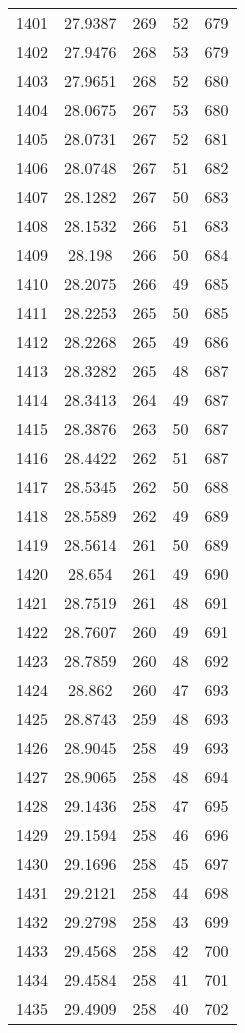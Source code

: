 \documentclass[12pt,a4paper]{article}
\begin{document}
\begin{tabular}{r|cccc}
	1401 & 27.9387 & 269 & 52 & 679 \\
	1402 & 27.9476 & 268 & 53 & 679 \\
	1403 & 27.9651 & 268 & 52 & 680 \\
	1404 & 28.0675 & 267 & 53 & 680 \\
	1405 & 28.0731 & 267 & 52 & 681 \\
	1406 & 28.0748 & 267 & 51 & 682 \\
	1407 & 28.1282 & 267 & 50 & 683 \\
	1408 & 28.1532 & 266 & 51 & 683 \\
	1409 & 28.198 & 266 & 50 & 684 \\
	1410 & 28.2075 & 266 & 49 & 685 \\
	1411 & 28.2253 & 265 & 50 & 685 \\
	1412 & 28.2268 & 265 & 49 & 686 \\
	1413 & 28.3282 & 265 & 48 & 687 \\
	1414 & 28.3413 & 264 & 49 & 687 \\
	1415 & 28.3876 & 263 & 50 & 687 \\
	1416 & 28.4422 & 262 & 51 & 687 \\
	1417 & 28.5345 & 262 & 50 & 688 \\
	1418 & 28.5589 & 262 & 49 & 689 \\
	1419 & 28.5614 & 261 & 50 & 689 \\
	1420 & 28.654 & 261 & 49 & 690 \\
	1421 & 28.7519 & 261 & 48 & 691 \\
	1422 & 28.7607 & 260 & 49 & 691 \\
	1423 & 28.7859 & 260 & 48 & 692 \\
	1424 & 28.862 & 260 & 47 & 693 \\
	1425 & 28.8743 & 259 & 48 & 693 \\
	1426 & 28.9045 & 258 & 49 & 693 \\
	1427 & 28.9065 & 258 & 48 & 694 \\
	1428 & 29.1436 & 258 & 47 & 695 \\
	1429 & 29.1594 & 258 & 46 & 696 \\
	1430 & 29.1696 & 258 & 45 & 697 \\
	1431 & 29.2121 & 258 & 44 & 698 \\
	1432 & 29.2798 & 258 & 43 & 699 \\
	1433 & 29.4568 & 258 & 42 & 700 \\
	1434 & 29.4584 & 258 & 41 & 701 \\
	1435 & 29.4909 & 258 & 40 & 702 \\

\end{tabular}
\end{document}
